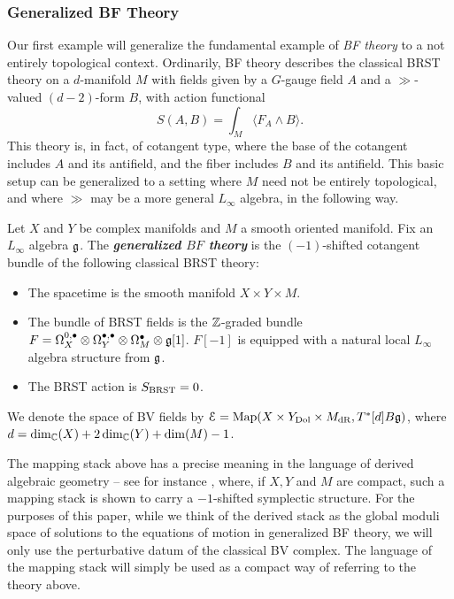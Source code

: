 \documentclass[10pt, oneside]{article}
\newcommand{\defterm}[1]{\textbf{\emph{#1}}}
\begin{document}
\subsubsection{Generalized BF Theory} \label{gen_BF_section}

Our first example will generalize the fundamental example of \emph{BF theory} to a not entirely topological context.  Ordinarily, BF theory describes the classical BRST theory on a $d$-manifold $M$ with fields given by a $G$-gauge field $A$ and a $\gg$-valued $(d-2)$-form $B$, with action functional
\[S(A,B) = \int_M \langle F_A \wedge B \rangle.\]
This theory is, in fact, of cotangent type, where the base of the cotangent includes $A$ and its antifield, and the fiber includes $B$ and its antifield.  This basic setup can be generalized to a setting where $M$ need not be entirely topological, and where $\gg$ may be a more general $L_\infty$ algebra, in the following way.

\begin{definition}
Let $X$ and $Y$ be complex manifolds and $M$ a smooth oriented manifold. Fix an $L_\infty$ algebra $\mathfrak g$. The \defterm{generalized $BF$ theory} is the $(-1)$-shifted cotangent bundle of the following classical BRST theory:
\begin{itemize}
\item The spacetime is the smooth manifold $X\times Y\times M$.

\item The bundle of BRST fields is the $\mathbb Z$-graded bundle $F = \Omega^{0,\bullet}_X \otimes \Omega^{\bullet,\bullet}_Y \otimes \Omega^\bullet_M \otimes \mathfrak g[1]$. $F[-1]$ is equipped with a natural local $L_\infty$ algebra structure from $\mathfrak g$.

\item The BRST action is $S_{\mathrm{BRST}} = 0$.
\end{itemize}
We denote the space of BV fields by $\mathcal E = \operatorname{Map}(X\times Y_{\mathrm{Dol}}\times M_{\mathrm{dR}}, T^*[d] B\mathfrak g)$, where $d = \dim_\mathbb C(X) + 2\dim_\mathbb C(Y) + \dim(M) - 1$.
\label{def:generalizedBF}
\end{definition}


\begin{remark} \label{mapping_stack_remark}
The mapping stack above has a precise meaning in the language of derived algebraic geometry -- see for instance \cite{PTVV}, where, if $X, Y$ and $M$ are compact, such a mapping stack is shown to carry a $-1$-shifted symplectic structure.  For the purposes of this paper, while we think of the derived stack as the global moduli space of solutions to the equations of motion in generalized BF theory, we will only use the perturbative datum of the classical BV complex.  The language of the mapping stack will simply be used as a compact way of referring to the theory above. 
\end{remark}
\end{document}
